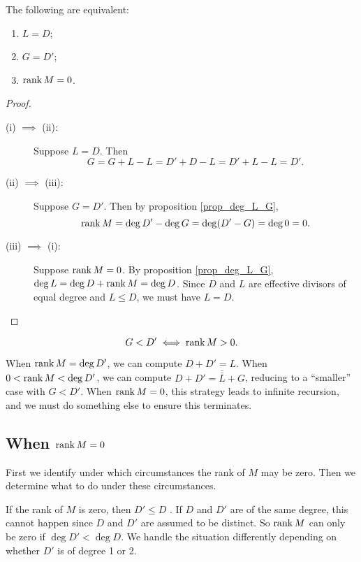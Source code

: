 \begin{proposition}
  The following are equivalent:
  \begin{enumerate}[label=(\roman*)]
    \item $L = D$;
    \item $G = D'$;
    \item $\operatorname{rank} M = 0$.
  \end{enumerate}
\end{proposition}
\begin{proof}
  \begin{description}
    \item[(i) $\implies$ (ii):]
      Suppose $L = D$. Then
        \[ G = G + L - L = D' + D - L = D' + L - L = D'. \]
    \item[(ii) $\implies$ (iii):]
      Suppose $G = D'$.
      Then by proposition \ref{prop_deg_L_G},
        \[ \operatorname{rank} M = \deg D' - \deg G = \deg(D' - G) = \deg 0 = 0. \]
    \item[(iii) $\implies$ (i):]
      Suppose $\operatorname{rank} M = 0$.
      By proposition \ref{prop_deg_L_G}, $\deg L = \deg D + \operatorname{rank} M = \deg D$.
      Since $D$ and $L$ are effective divisors of equal degree and $L \leq D$, we must have $L = D$.
  \end{description}
\end{proof}
\begin{corollary}
  \[ G < D' \iff \operatorname{rank} M > 0. \]
\end{corollary}

When $\operatorname{rank} M = \deg D'$, we can compute $D + D' = L$.
When $0 < \operatorname{rank} M < \deg D'$, we can compute $D + D' = \bar{\bar L} + G$, reducing to a ``smaller'' case with $G < D'$.
When $\operatorname{rank} M = 0$, this strategy leads to infinite recursion, and we must do something else to ensure this terminates.




\subsection{When $\operatorname{rank} M = 0$}

First we identify under which circumstances the rank of $M$ may be zero.
Then we determine what to do under these circumstances.

If the rank of $M$ is zero, then $D' \leq D$ .
If $D$ and $D'$ are of the same degree, this cannot happen since $D$ and $D'$ are assumed to be distinct.
So $\operatorname{rank} M$ can only be zero if $\deg D' < \deg D$.
We handle the situation differently depending on whether $D'$ is of degree 1 or 2.

